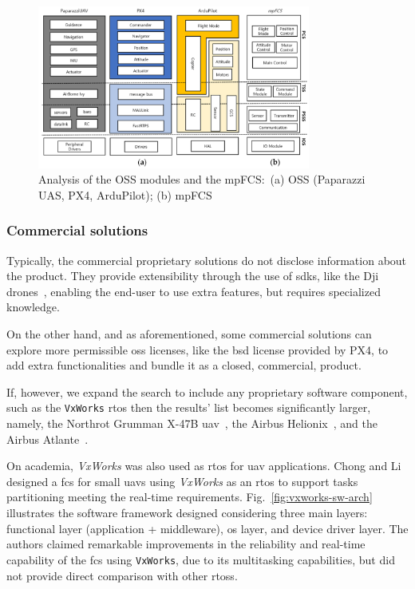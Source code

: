 \begin{figure}[!hbt]
  \centering
  \includegraphics[width=0.8\textwidth]{./img/png/uav-sw-arch-oss.png} 
%   
  \caption[Analysis of the OSS modules and the mpFCS]{Analysis of the OSS
    modules and the mpFCS:~(a) OSS (Paparazzi UAS, PX4, ArduPilot); (b) mpFCS~\cite{jargalsaikhan2022architectural}\footnotemark}%
  \label{fig:uav-sw-arch-oss-compar}
\end{figure}
%

\subsubsection{Commercial solutions}%
\label{sec:commercial-solutions-sw}
Typically, the commercial proprietary solutions do not disclose information
about the product. They provide extensibility through the use of
\glspl{sdk}, like the Dji drones~\cite{djiSDK}, enabling the end-user to use
extra features, but requires specialized knowledge.

On the other hand, and as aforementioned, some commercial solutions can explore
more permissible \gls{oss} licenses, like the \gls{bsd} license provided by PX4,
to add extra functionalities and bundle it as a closed, commercial, product.

If, however, we expand the search to include any proprietary
software component, such as the \texttt{VxWorks} \gls{rtos} then the results'
list becomes significantly larger, namely, the Northrot Grumman X-47B
\gls{uav}~\cite{vxWorks-uav-northrop}, the Airbus
Helionix~\cite{vxWorks-uav-aribus-helionic}, and the Airbus
Atlante~\cite{vxWorks-uav-aribus-atlante}.

On academia, \emph{VxWorks} was also used as \gls{rtos} for \gls{uav}
applications. Chong and Li~\cite{vxworksFCS} designed a \gls{fcs} for small
\glspl{uav} using \emph{VxWorks} as an \gls{rtos} to support tasks partitioning
meeting the real-time requirements. Fig.~\ref{fig:vxworks-sw-arch} illustrates
the software framework designed considering three main layers: functional layer
(application + middleware), \gls{os} layer, and device driver layer. The authors
claimed remarkable improvements in the reliability and real-time capability of
the \gls{fcs} using \texttt{VxWorks}, due to its multitasking capabilities, but did not provide direct comparison with
other \glspl{rtos}.

